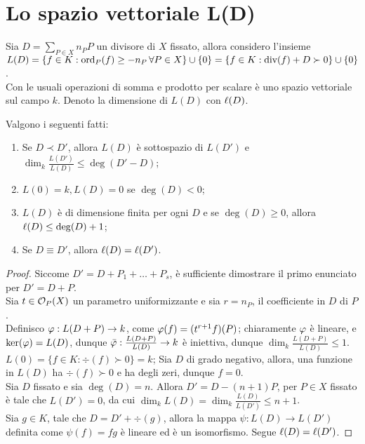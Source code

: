     \section{Lo spazio vettoriale L(D)}
        Sia $D = \sum_{P \in X}n_PP$ un divisore di $X$ fissato, allora 
        considero l'insieme $L(D) = \{f \in K : \text{ord}_P(f) \geq -n_P \, 
        \forall P \in X\} \cup \{0\} = \{f \in K : \text{div}(f) + D \succ 0\} \cup 
        \{0\}$.\\
        Con le usuali operazioni di somma e prodotto per scalare è uno spazio 
        vettoriale sul campo $k$. Denoto la dimensione di $L(D)$ con $\ell(D)$.
        \begin{proposizione}
            Valgono i seguenti fatti: \begin{enumerate}
                \item Se $D \prec D'$, allora $L(D)$ è sottospazio di $L(D')$ 
                e $\dim_k \frac{L(D')}{L(D)} \leq \deg(D'-D)$;
                \item $L(0) = k, L(D) = 0$ se $\deg(D) < 0$;
                \item $L(D)$ è di dimensione finita per ogni $D$ e se $\deg(D) 
                \geq 0$, allora $\ell(D) \leq \deg(D) + 1$;
                \item Se $D \equiv D'$, allora $\ell(D) = \ell(D')$.
            \end{enumerate} 
        \end{proposizione}
        \begin{proof}
            Siccome $D' = D + P_1 + \ldots + P_s$, è sufficiente dimostrare 
            il primo enunciato per $D' = D + P$.\\
            Sia $t \in \mathcal{O}_P(X)$ un parametro uniformizzante e sia $r = n_P$, 
            il coefficiente in $D$ di $P$.\\
            Definisco $\varphi : L(D + P) \to k$, come $\varphi(f) = (t^{r+1}f)(P)$; 
            chiaramente $\varphi$ è lineare, e $\ker(\varphi) = L(D)$, dunque 
            $\bar{\varphi} : \frac{L(D+P)}{L(D)} \to k$ è iniettiva, dunque 
            $\dim_k \frac{L(D+P)}{L(D)} \leq 1$.\\
            $L(0) = \{f \in K : \div(f) \succ 0\} = k$; Sia $D$ di grado 
            negativo, allora, una funzione in $L(D)$ ha $\div(f) \succ 0$ e ha 
            degli zeri, dunque $f = 0$.\\
            Sia $D$ fissato e sia $\deg(D) = n$. Allora $D' = D -(n+1)P$, per 
            $P \in X$ fissato è tale che $L(D') = 0$, da cui $\dim_k L(D) = 
            \dim_k \frac{L(D)}{L(D')} \leq n+1$.\\
            Sia $g \in K$, tale che $D = D' + \div(g)$, allora la mappa $\psi 
            : L(D) \to L(D')$ definita come $\psi(f) = fg$ è lineare ed è un 
            isomorfismo. Segue $\ell(D) = \ell(D')$.
        \end{proof}
